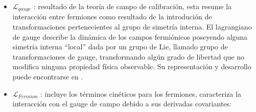 \begin{itemize}

\item $\mathcal{L}_{gauge}$ : resultado de la teoría de campo de calibración, esta resume la interacción entre fermiones como resultado de la introdución de transformaciones pertenecientes al grupo de simetría interna. %
El lagrangiano de gauge describe la dinámica de los campos fermiónicos poseyendo alguna simetría interna ``local'' dada por un grupo de Lie, llamado grupo de transformaciones de gauge, transformando algún grado de libertad que no modifica ninguna propiedad física observable. %
Su representación y desarrollo puede encontrarse en \cite{romao_resource_2012}.

\item $\mathcal{L}_{Fermion}$ : incluye los términos cinéticos para los fermiones, caracteriza la interacción con el gauge de campo debido a sus derivadas covariantes:


\end{itemize}
